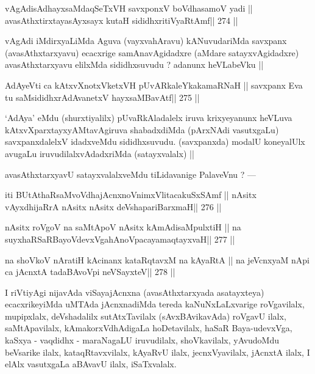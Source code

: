 \begin{shl}
vAgAdisAdhayxsaMdaqSeTxVH \footnotemark[1]savxponxV \footnotemark[2]boVdhasamoV yadi ||
avasAthxtirxtayasAyxsayx kutaH sididhxritiVyaRtAmf\hfill || 274 ||
\end{shl}

\begin{artha}
vAgAdi iMdirxyaLiMda Aguva (vayxvahAravu) kANuvudariMda savxpanx (avasAthxtarxyavu) ecacxrige samAnavAgidadxre (aMdare satayxvAgidadxre) avasAthxtarxyavu elilxMda sididhxsuvudu ? adanunx heVLabeVku ||
\end{artha}

\begin{shl}
AdAyeVti ca kAtxvXnotxVketxVH pUvARkaleYkakamaRNaH ||
savxpanx Eva tu saMsididhxrAdAvanetxV hayxsaMBavAtf\hfill || 275 ||
\end{shl}

\begin{artha}
`AdAya' eMdu (shurxtiyalilx) pUvaRkAladalelx iruva krixyeyanunx heVLuva kAtxvXparxtayxyAMtavAgiruva shabadxdiMda (pArxNAdi vasutxgaLu) savxpanxdalelxV idadxveMdu sididhxsuvudu. (savxpanxda) modalU koneyalUlx avugaLu iruvudilalxvAdadxriMda (satayxvalalx) ||
\end{artha}

\begin{artha}
avasAthxtarxyavU satayxvalalxveMdu tiLidavanige PalaveVnu ? ---
\end{artha}

\begin{shl}
iti BUtAthaRsaMvoVdhajAcnxnoVnimxVlitacakuSxSAmf ||
nAsitx vAyxdhijaRrA nAsitx nAsitx deVshapariBarxmaH\hfill || 276 ||
\end{shl}

\begin{shl}
nAsitx roVgoV na saMtApoV nAsitx kAmAdisaMpulxtiH ||
na suyxhaRSaRBayoVdevxVgahAnoVpacayamaqtayxvaH\hfill || 277 ||
\end{shl}

\begin{shl}
na shoVkoV nAratiH kAcinanx kataRqtavxM na kAyaRtA ||
na jeVcnxyaM nApi ca jAcnxtA tadaBAvoV\s pi neVSayxteV\hfill || 278 ||
\end{shl}

\begin{artha}
I riVtiyAgi nijavAda viSayajAcnxna (avasAthxtarxyada asatayxteya) ecacxrikeyiMda uMTAda jAcnxnadiMda tereda kaNuNxLaLxvarige roVgavilalx, mupipxlalx, deVshadalilx sutAtxTavilalx (sAvxBAvikavAda) roVgavU ilalx, saMtApavilalx, kAmakorxVdhAdigaLa hoDetavilalx, haSaR Baya-udevxVga, kaSxya - vaqdidhx - maraNagaLU iruvudilalx, shoVkavilalx, yAvudoMdu beVsarike ilalx, kataqRtavxvilalx, kAyaRvU ilalx, jecnxVyavilalx, jAcnxtA ilalx, I elAlx vasutxgaLa aBAvavU ilalx, iSaTxvalalx.
\end{artha}

